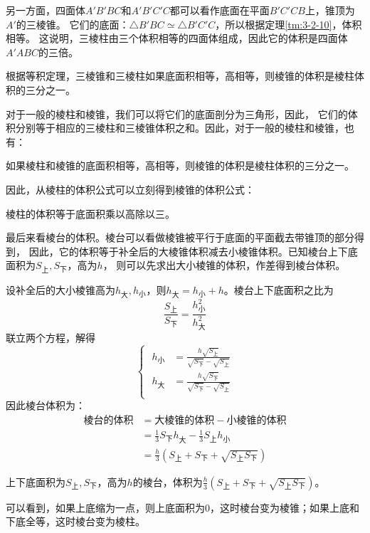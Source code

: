 \documentclass[12pt,UTF8]{ctexbook}
\begin{document}
另一方面，四面体$A'B'BC$和$A'B'C'C$都可以看作底面在平面$B'C'CB$上，锥顶为$A'$的三棱锥。
它们的底面：$\triangle B'BC \simeq \triangle B'C'C$，所以根据定理\ref{tm:3-2-10}，体积相等。
这说明，三棱柱由三个体积相等的四面体组成，因此它的体积是四面体$A'ABC$的三倍。

根据等积定理，三棱锥和三棱柱如果底面积相等，高相等，则棱锥的体积是棱柱体积的三分之一。

对于一般的棱柱和棱锥，我们可以将它们的底面剖分为三角形，因此，
它们的体积分别等于相应的三棱柱和三棱锥体积之和。因此，对于一般的棱柱和棱锥，也有：
\begin{tm}\label{tm:3-2-20}
    如果棱柱和棱锥的底面积相等，高相等，则棱锥的体积是棱柱体积的三分之一。
\end{tm}
因此，从棱柱的体积公式可以立刻得到棱锥的体积公式：
\begin{tm}\label{tm:3-2-30}
    棱柱的体积等于底面积乘以高除以三。
\end{tm}

最后来看棱台的体积。棱台可以看做棱锥被平行于底面的平面截去带锥顶的部分得到，
因此，它的体积等于补全后的大棱锥体积减去小棱锥体积。已知棱台上下底面积为$S_{\text{上}},S_{\text{下}}$，高为$h$，
则可以先求出大小棱锥的体积，作差得到棱台体积。

设补全后的大小棱锥高为$h_{\text{大}},h_{\text{小}}$，则$h_{\text{大}} = h_{\text{小}} + h$。棱台上下底面积之比为
$$ \frac{S_{\text{上}}}{S_{\text{下}}} = \frac{h_{\text{小}}^2}{h_{\text{大}}^2} $$
联立两个方程，解得
$$ 
    \left\{\,\,
    \begin{array}{cl}
        h_{\text{小}} &= \frac{h\sqrt{S_{\text{上}}}}{\sqrt{S_{\text{下}}} - \sqrt{S_{\text{上}}}} \\
        h_{\text{大}} &= \frac{h\sqrt{S_{\text{下}}}}{\sqrt{S_{\text{下}}} - \sqrt{S_{\text{上}}}} \\
    \end{array}
    \right.
$$
因此棱台体积为：
\begin{align*}
    \text{棱台的体积} &= \text{大棱锥的体积} - \text{小棱锥的体积}  \\
    &= \frac{1}{3}S_{\text{下}}h_{\text{大}} - \frac{1}{3}S_{\text{上}}h_{\text{小}} \\
    &= \frac{h}{3}\left(S_{\text{上}} + S_{\text{下}} + \sqrt{S_{\text{上}}S_{\text{下}}}\right) 
\end{align*}
\begin{tm}\label{tm:3-2-40}
    上下底面积为$S_{\text{上}},S_{\text{下}}$，高为$h$的棱台，体积为$\frac{h}{3}\left(S_{\text{上}} + S_{\text{下}} + \sqrt{S_{\text{上}}S_{\text{下}}}\right)$。
\end{tm}
可以看到，如果上底缩为一点，则上底面积为$0$，这时棱台变为棱锥；如果上底和下底全等，这时棱台变为棱柱。
\end{document}
